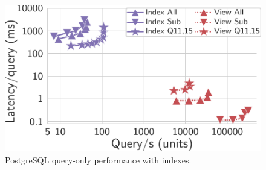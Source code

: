 \documentclass[sigplan,twocolumn,review,anonymous]{acmart}
\begin{document}
\begin{figure}[t]
\begin{minipage}{.57\linewidth}
		\label{fig:postgres}
	\vspace*{-0.2em}
	\end{minipage}%
	\hspace*{0.07\linewidth}
	\begin{minipage}{.36\linewidth}
		\centering
		\includegraphics[width=0.85\linewidth]{postgres/postgresViewVsIndex}
		\vspace*{-10pt}
		\caption{PostgreSQL query-only performance with indexes.}
		\label{fig:postgresNoViews}
	\vspace{-10pt}
	\end{minipage}
	\vspace{-10pt}
\end{figure}

\end{document}
